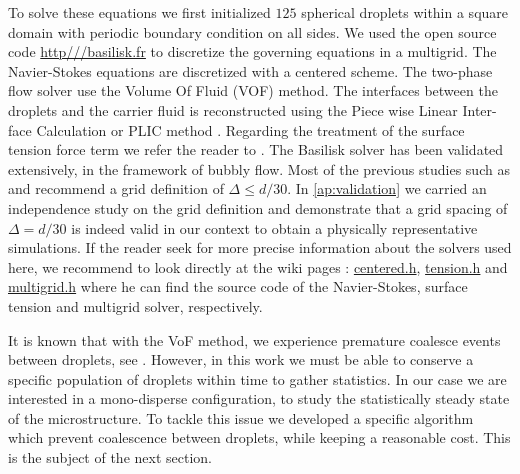 To solve these equations we first initialized $125$ spherical droplets within a square domain with periodic boundary condition on all sides. 
We used the open source code \url{http///basilisk.fr} to discretize the governing equations in a multigrid. 
The Navier-Stokes equations are discretized with a centered scheme.
The two-phase flow solver use the Volume Of Fluid (VOF) method. 
The interfaces between the droplets and the carrier fluid is reconstructed using the Piece wise Linear Inter-face Calculation or PLIC method \citet[Chapter 5.]{tryggvason2011direct}.
Regarding the treatment of the surface tension force term we refer the reader to \citet{popinet2018numerical}. 
The Basilisk solver has been validated extensively, in the framework of bubbly flow. 
Most of the previous studies such as \citep{hidman2023assessing} and \citet{innocenti2020direct} recommend a grid definition of $\Delta \le d/30$. 
In \ref{ap:validation} we carried an independence study on the grid definition and demonstrate that a grid spacing of $\Delta = d/30$ is indeed valid in our context to obtain a physically representative simulations.
If the reader seek for more precise information about the solvers used here, we recommend to look directly at the wiki pages : \href{http://basilisk.fr/src/navier-stokes/centered.h}{centered.h}, \href{http://basilisk.fr/src/tension.h}{tension.h} and \href{http://basilisk.fr/src/grid/multigrid.h}{multigrid.h} where he can find the source code of the Navier-Stokes, surface tension and multigrid solver, respectively. 

It is known that with the VoF method, we experience premature coalesce events between droplets, see  \citet[Appendix B]{innocenti2020direct}.
However, in this work we must be able to conserve a specific population of droplets within time to gather statistics.
In our case  we are interested in a mono-disperse configuration, to study the statistically steady state of the microstructure. 
To tackle this issue we developed a specific algorithm which prevent coalescence between droplets, while keeping a reasonable cost. 
This is the subject of the next section. 






